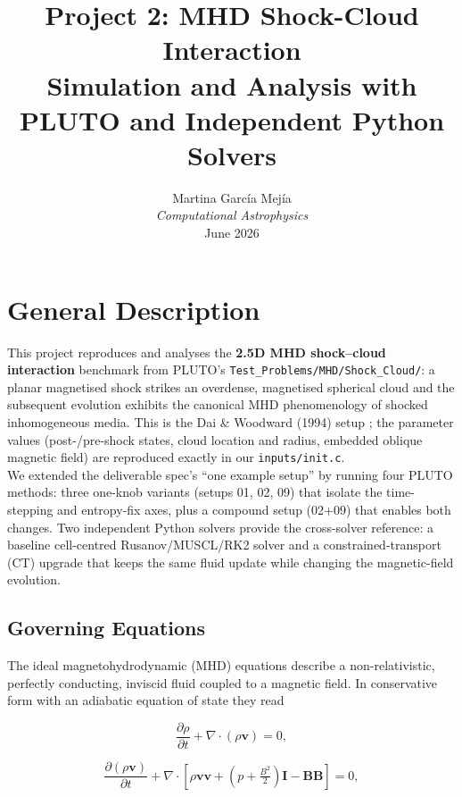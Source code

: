 \documentclass[11pt,a4paper]{article}
\title{\textbf{Project 2: MHD Shock-Cloud Interaction}\\[4pt] \large Simulation and Analysis with PLUTO and Independent Python Solvers} \author{Martina García Mejía\\ \small\textit{Computational Astrophysics}\\[4pt] \small June 2026} \date{}
\begin{document}
\maketitle \thispagestyle{fancy}

\section{General Description}

This project reproduces and analyses the \textbf{2.5D MHD shock--cloud interaction} benchmark from PLUTO's \texttt{Test\_Problems/MHD/Shock\_Cloud/}: a planar magnetised shock strikes an overdense, magnetised spherical cloud and the subsequent evolution exhibits the canonical MHD phenomenology of shocked inhomogeneous media. This is the Dai \& Woodward (1994) setup \cite{dai1994}; the parameter values (post-/pre-shock states, cloud location and radius, embedded oblique magnetic field) are reproduced exactly in our \texttt{inputs/init.c}.
\\

We extended the deliverable spec's ``one example setup'' by running four PLUTO methods: three one-knob variants (setups 01, 02, 09) that isolate the time-stepping and entropy-fix axes, plus a compound setup (02+09) that enables both changes. Two independent Python solvers provide the cross-solver reference: a baseline cell-centred Rusanov/MUSCL/RK2 solver and a constrained-transport (CT) upgrade that keeps the same fluid update while changing the magnetic-field evolution.

\subsection{Governing Equations}

The ideal magnetohydrodynamic (MHD) equations describe a non-relativistic, perfectly conducting, inviscid fluid coupled to a magnetic field. In conservative form with an adiabatic equation of state they read

\begin{equation}
\frac{\partial \rho}{\partial t} + \nabla \cdot (\rho \mathbf{v}) = 0,
\label{eq:cont}
\end{equation}

\begin{equation}
\frac{\partial (\rho \mathbf{v})}{\partial t} + \nabla \cdot \left[ \rho \mathbf{v}\mathbf{v} + \left(p + \tfrac{B^2}{2}\right)\mathbf{I} - \mathbf{B}\mathbf{B} \right] = 0,
\label{eq:mom}
\end{equation}
\end{document}
